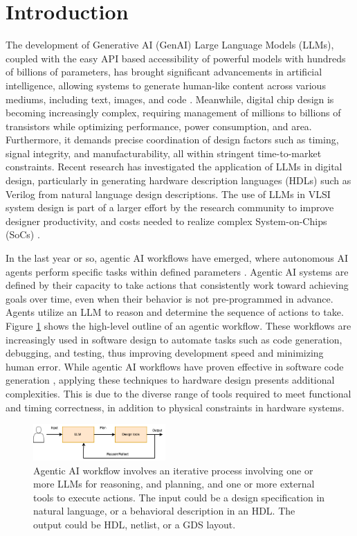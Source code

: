 \section{Introduction}
\label{sec:introduction}

The development of Generative AI (GenAI) Large Language Models (LLMs), coupled with the easy API based accessibility of powerful models with hundreds of billions of parameters,  has brought significant advancements in artificial intelligence, allowing systems to generate human-like content across various mediums, including text, images, and code \cite{intro2LLM}. Meanwhile, digital chip design is becoming increasingly complex, requiring management of millions to billions of transistors while optimizing performance, power consumption, and area. Furthermore, it demands precise coordination of design factors such as timing, signal integrity, and manufacturability, all within stringent time-to-market constraints. Recent research has investigated the application of LLMs in digital design, particularly in generating hardware description languages (HDLs) such as Verilog from natural language design descriptions. The use of LLMs in VLSI system design is part of a larger effort by the research community to improve designer productivity, and costs needed to realize complex System-on-Chips (SoCs) \cite{ajayi2019openroad}.

In the last year or so, agentic AI workflows have emerged, where autonomous AI agents perform specific tasks within defined parameters \cite{promptengineering2024}. Agentic AI systems are defined by their capacity to take actions that consistently work toward achieving goals over time, even when their behavior is not pre-programmed in advance. Agents utilize an LLM to reason and determine the sequence of actions to take. Figure \ref{fig:agentic_overview} shows the high-level outline of an agentic workflow.  These workflows are increasingly used in software design to automate tasks such as code generation, debugging, and testing, thus improving development speed and minimizing human error. While agentic AI workflows have proven effective in software code generation \cite{alphacodium}, applying these techniques to hardware design presents additional complexities. This is due to the diverse range of tools required to meet functional and timing correctness, in addition to physical constraints in hardware systems.


\begin{figure}[htbp]
	\includegraphics[width=0.45\textwidth]{figs/agentic_overview.png}
	\caption{Agentic AI workflow involves an iterative process involving one or more LLMs for reasoning, and planning, and one or more external tools to execute actions. The input could be a design specification in natural language, or a behavioral description in an HDL. The output could be HDL, netlist, or a GDS layout.
}
	\label{fig:agentic_overview}
\end{figure}

